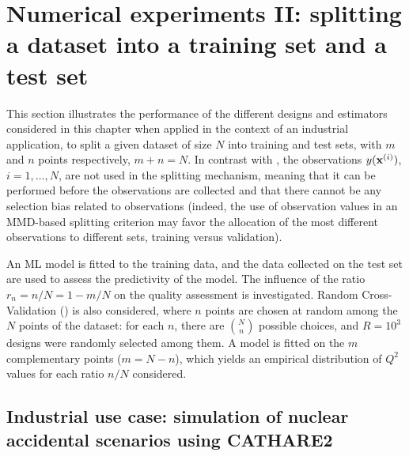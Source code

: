 \section{Numerical experiments II: splitting a dataset into a training set and a test set}\label{sec:val_res2}
This section illustrates the performance of the different designs and estimators considered in this chapter when applied in the context of an industrial application, to split a given dataset of size $N$ into training and test sets, with $m$ and $n$ points respectively, $m+n=N$. 
In contrast with \citet{josvak21}, the observations $y({\bf x}^{(i)})$, $i=1,\ldots,N$, are not used in the splitting mechanism, meaning that it can be performed before the observations are collected and that there cannot be any selection bias related to observations 
(indeed, the use of observation values in an MMD-based splitting criterion may favor the allocation of the most different observations to different sets, training versus validation).

An ML model is fitted to the training data, and the data collected on the test set are used to assess the predictivity of the model. 
The influence of the ratio $r_n=n/N=1-m/N$ on the quality assessment is investigated. 
Random Cross-Validation () is also considered, where $n$ points are chosen at random among the $N$ points of the dataset: for each $n$, there are $N \choose n$ possible choices, and $R=10^3$ designs were randomly selected among them. 
A model is fitted on the $m$ complementary points ($m=N-n$), which yields an empirical distribution of $Q^2$ values for each ratio $n/N$ considered. 

\subsection{Industrial use case: simulation of nuclear accidental scenarios using CATHARE2}


